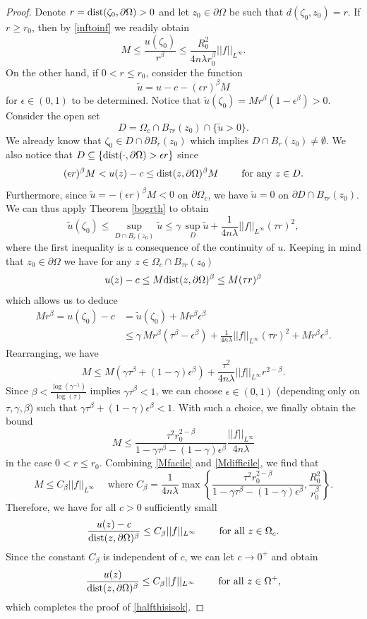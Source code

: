 \documentclass[12pt]{amsart}
\def \O {\Omega}
\def \t {\tau}
\begin{document}
\begin{proof}
Denote $r={\rm{dist}}(\zeta_0, \partial\O)>0$ and let $z_0\in\partial\O$ be such that $d(\zeta_0,z_0)=r$. If $r\geq r_0$, then by \eqref{inftoinf} we readily obtain
\begin{equation}\label{Mfacile}
M\leq \frac{u(\zeta_0)}{r^\beta}\leq \frac{R_0^2}{4n\lambda r_0^\beta }||f||_{L^{\infty}}.
\end{equation}
On the other hand, if $0<r\leq r_0$, consider the function
$$
\tilde{u}=u-c-(\epsilon r)^\beta M
$$
for $\epsilon\in (0,1)$ to be determined. Notice that $\tilde{u}(\zeta_0)=Mr^\beta(1-\epsilon^\beta)>0$. Consider the open set
$$
D=\O_c \cap B_{\t r}(z_0)\cap \{\tilde{u}>0\}. 
$$
We already know that $\zeta_0\in D\cap \partial B_{r}(z_0)$ which implies $D\cap B_r(z_0)\neq \emptyset$. We also notice that $D\subseteq \{{\rm{dist}}(\cdot, \partial\O)>\epsilon r\}$ since 
$$(\epsilon r)^\beta M<u(z)-c\leq {\rm{dist}}(z, \partial\O)^\beta M \qquad \text{ for any } z\in D.$$ 
Furthermore, since $\tilde{u}=-(\epsilon r)^\beta M<0$ on $\partial \O_c$, we have $\tilde{u}=0$ on $\partial D\cap  B_{\t r}(z_0)$. We can thus apply Theorem \ref{bogrth} to obtain 
$$
\tilde{u}(\zeta_0)\leq\sup_{D \cap B_r(z_0)} \tilde{u} \leq \gamma \, \sup_{D} \tilde{u} + \frac{1}{4n\lambda} ||f||_{L^{\infty}} (\tau r)^2,
$$
where the first inequality is a consequence of the continuity of $u$. Keeping in mind that $z_0\in\partial\O$ we have for any $z\in \O_c\cap B_{\t r}(z_0)$ 
$$u(z)-c\leq M {\rm{dist}}(z, \partial\O)^\beta \leq M (\t r)^\beta$$
which allows us to deduce
\begin{align*}
M r^\beta=u(\zeta_0)-c &=\tilde{u}(\zeta_0)+Mr^\beta \epsilon^\beta \\
& \leq \gamma \, M r^\beta \left( \t ^\beta -\epsilon^\beta\right) + \frac{1}{4n\lambda} ||f||_{L^{\infty}} (\tau r)^2 + Mr^\beta \epsilon^\beta.
\end{align*}
Rearranging, we have
$$
M\leq M (\gamma \tau^\beta + (1-\gamma)\epsilon^\beta )+ \frac{\t^2}{4n\lambda} ||f||_{L^{\infty}} r^{2-\beta}.
$$
Since $\beta<\frac{\log(\gamma^{-1})}{\log(\tau)}$ implies $\gamma\t^\beta <1$, we can choose $\epsilon\in (0,1)$ (depending only on $\t, \gamma, \beta$) such that $\gamma \tau^\beta + (1-\gamma)\epsilon^\beta < 1$. With such a choice, we finally obtain the bound
\begin{equation}\label{Mdifficile}
M\leq  \frac{\t^2 r_0^{2-\beta}}{1-\gamma \tau^\beta - (1-\gamma)\epsilon^\beta}\frac{||f||_{L^{\infty}}}{4n\lambda}
\end{equation}
in the case $0<r\leq r_0$. Combining \eqref{Mfacile} and \eqref{Mdifficile}, we find that
$$
M\leq C_\beta ||f||_{L^{\infty}}\quad\mbox{ where }C_\beta=\frac{1}{4n\lambda}\max\left\{\frac{\t^2 r_0^{2-\beta}}{1-\gamma \tau^\beta - (1-\gamma)\epsilon^\beta},\frac{R_0^2}{ r_0^\beta }\right\}.
$$
Therefore, we have for all $c > 0$ sufficiently small
$$
\frac{u(z)-c}{{\rm{dist}}(z, \partial\O)^{\beta}}\leq C_\beta ||f||_{L^{\infty}}\qquad\mbox{ for all }z\in\O_c.
$$
Since the constant $C_{\beta}$ is independent of $c$, we can let $c\to 0^+$ and obtain
$$
\frac{u(z)}{{\rm{dist}}(z, \partial\O)^{\beta}}\leq C_\beta ||f||_{L^{\infty}}\qquad\mbox{ for all }z\in\O^+,
$$
which completes the proof of \eqref{halfthisisok}.
\end{proof}
\end{document}
